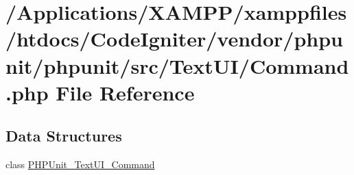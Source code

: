 \hypertarget{_command_8php}{}\section{/\+Applications/\+X\+A\+M\+P\+P/xamppfiles/htdocs/\+Code\+Igniter/vendor/phpunit/phpunit/src/\+Text\+U\+I/\+Command.php File Reference}
\label{_command_8php}
\subsection*{Data Structures}
\begin{DoxyCompactItemize}
\item 
class \mbox{\hyperlink{class_p_h_p_unit___text_u_i___command}{P\+H\+P\+Unit\+\_\+\+Text\+U\+I\+\_\+\+Command}}
\end{DoxyCompactItemize}
